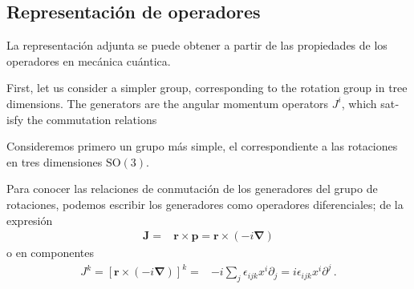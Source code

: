 
  
\subsection{Representación  de operadores}
La representación adjunta se puede obtener a partir de las propiedades de los operadores en mecánica cuántica.

\begin{english}
First, let us consider a simpler group, corresponding to the rotation group in tree dimensions. The generators are the angular momentum operators $J^i$, which satisfy the commutation relations
\end{english}
\begin{spanish}
Consideremos primero un grupo más simple, el correspondiente a las rotaciones en tres dimensiones $\operatorname{SO(3)}$. 
\end{spanish}
Para conocer las relaciones de conmutación de los generadores del grupo de rotaciones, podemos escribir los generadores como operadores diferenciales; de la expresión 
\begin{align}
  \mathbf{J}=&\mathbf{r}\times \mathbf{p}=\mathbf{r}\times (-i\boldsymbol{\nabla})
\end{align}
o en componentes
\begin{align}
\label{eq:rxpi}
  J^k=\left[\mathbf{r}\times (-i\boldsymbol{\nabla})\right]^k=&
-i\sum_j\epsilon_{ijk}x^i\partial_j=i\epsilon_{ijk}x^i\partial^j\,.
\end{align}

